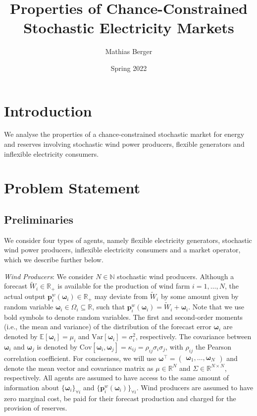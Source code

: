 \documentclass{article}
\title{Properties of Chance-Constrained Stochastic Electricity Markets}
\author{Mathias Berger}
\date{Spring 2022}
\begin{document}
\maketitle

\section{Introduction}

We analyse the properties of a chance-constrained stochastic market for energy and reserves involving stochastic wind power producers, flexible generators and inflexible electricity consumers. 

\section{Problem Statement}

\subsection{Preliminaries}

We consider four types of agents, namely flexible electricity generators, stochastic wind power producers, inflexible electricity consumers and a market operator, which we describe further below.

\textit{Wind Producers}: We consider $N \in \mathbb{N}$ stochastic wind producers. Although a forecast $\tilde{W}_i \in \mathbb{R}_+$ is available for the production of wind farm $i = 1, \ldots, N$, the actual output $\mathbf{p}_i^w(\boldsymbol{\omega}_i) \in \mathbb{R}_+$ may deviate from $\tilde{W}_i$ by some amount given by random variable $\boldsymbol{\omega}_i \in \Omega_i \subseteq \mathbb{R}$, such that $\mathbf{p}_i^w(\boldsymbol{\omega}_i) = \tilde{W}_i + \boldsymbol{\omega}_i$. Note that we use bold symbols to denote random variables. The first and second-order moments (i.e., the mean and variance) of the distribution of the forecast error $\boldsymbol{\omega}_i$ are denoted by $\mathbb{E}[\boldsymbol{\omega}_i] = \mu_i$ and $\mbox{Var}[\boldsymbol{\omega}_i] = \sigma_i^2$, respectively. The covariance between $\boldsymbol{\omega}_i$ and $\boldsymbol{\omega}_j$ is denoted by $\mbox{Cov}[\boldsymbol{\omega}_i, \boldsymbol{\omega}_j] = \kappa_{ij} = \rho_{ij} \sigma_i \sigma_j$, with $\rho_{ij}$ the Pearson correlation coefficient. For conciseness, we will use $\boldsymbol{\omega}^\top = \begin{pmatrix} \boldsymbol{\omega}_1, \ldots, \boldsymbol{\omega}_N \end{pmatrix}$ and denote the mean vector and covariance matrix as $\mu \in \mathbb{R}^N$ and $\Sigma \in \mathbb{R}^{N \times N}$, respectively. All agents are assumed to have access to the same amount of information about $\{\boldsymbol{\omega}_i\}_{\forall i}$ and $\{\mathbf{p}_i^w(\boldsymbol{\omega}_i)\}_{\forall i}$. Wind producers are assumed to have zero marginal cost, be paid for their forecast production and charged for the provision of reserves.
\end{document}
